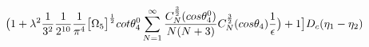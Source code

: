 \begin{equation}
\big{(}1 + \lambda^2 \frac{1}{3^2}\frac{1}{2^{10}}\frac{1}{\pi^4}\big{[}\Omega_5\big{]}^{\frac{1}{2}}cot{\theta_4^0}\sum_{N=1}^{\infty}\frac{C_N^{\frac{3}{2}}(cos{\theta_4^0})}{N(N + 3)}
C_N^{\frac{3}{2}}(cos{\theta_4})\frac{1}{\epsilon}\big{)} + 1\big{]}D_c(\eta_1 - \eta_2) 
\end{equation}

